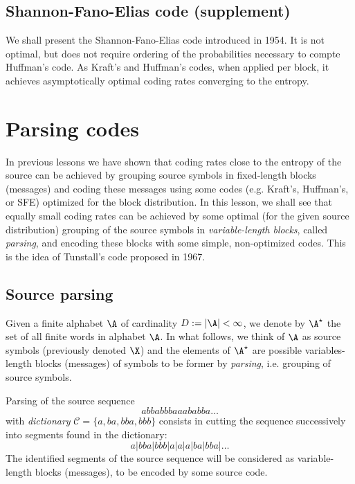 \documentclass[toc]{../cs-classes/cs-classes}
\begin{document}
\subsection{Shannon-Fano-Elias code (supplement)}
We shall present the Shannon-Fano-Elias code introduced in 1954. It is not optimal, but does not require ordering of the probabilities necessary to compte Huffman's code. As Kraft's and Huffman's codes, when applied per block, it achieves asymptotically optimal coding rates converging to the entropy.

\section{Parsing codes}
In previous lessons we have shown that coding rates close to the entropy of the source can be achieved by grouping source symbols in fixed-length blocks (messages) and coding these messages using some codes (e.g. Kraft's, Huffman's, or SFE) optimized for the block distribution. In this lesson, we shall see that equally small coding rates can be achieved by some optimal (for the given source distribution) grouping of the source symbols in \emph{variable-length blocks}, called \emph{parsing}, and encoding these blocks with some simple, non-optimized codes. This is the idea of Tunstall's code proposed in 1967.

\subsection{Source parsing}
Given a finite alphabet $\A$ of cardinality $D:=|\A|<\infty$, we denote by $\A^\star$ the set of all finite words in alphabet $\A$. In what follows, we think of $\A$ as source symbols (previously denoted $\X$) and the elements of $\A^\star$ are possible variables-length blocks (messages) of symbols to be former by \emph{parsing}, i.e. grouping of source symbols.

\begin{example}
    Parsing of the source sequence
    \begin{equation*}
        abbabbbaaababba\dots
    \end{equation*}
    with \emph{dictionary} $\mathcal{C} = \{a, ba, bba, bbb\}$ consists in cutting the sequence successively into segments found in the dictionary:
    \begin{equation*}
        a|bba|bbb|a|a|a|ba|bba|\dots
    \end{equation*}
    The identified segments of the source sequence will be considered as variable-length blocks (messages), to be encoded by some source code.
\end{example}
\end{document}
